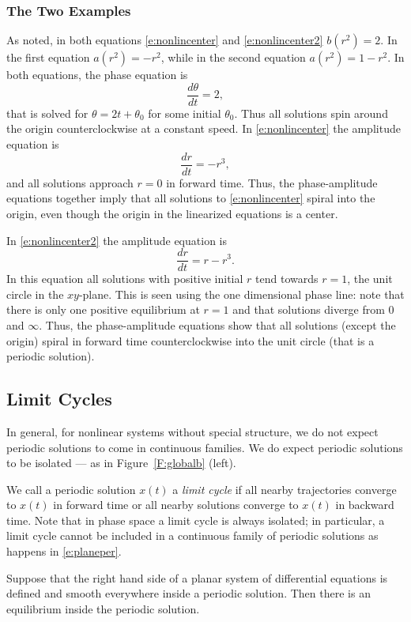 \documentclass{ximera}
\begin{document}
\subsubsection*{The Two Examples}

As noted, in both equations \eqref{e:nonlincenter} and \eqref{e:nonlincenter2}
$b(r^2) = 2$.  In the first equation $a(r^2) = -r^2$, while in
the second equation $a(r^2)=1-r^2$.  In both equations, the
phase equation is
\[
\frac{d\theta}{dt} = 2,
\]
that is solved for $\theta = 2t + \theta_0$ for some initial
$\theta_0$.  Thus all solutions spin around the origin
counterclockwise at a constant speed.  In \eqref{e:nonlincenter}
the amplitude equation is
\[
\frac{dr}{dt} = -r^3,
\]
and all solutions approach $r=0$ in forward time.  Thus, the 
phase-amplitude equations together imply that all solutions 
to \eqref{e:nonlincenter} spiral into the origin, even though the 
origin in the linearized equations is a center. 

In \eqref{e:nonlincenter2} the amplitude equation is 
\[
\frac{dr}{dt} = r-r^3.
\]
In this equation all solutions with positive initial $r$ tend towards 
$r=1$, the unit circle in the $xy$-plane.  This is seen using the one
dimensional phase line: note that there is only one positive equilibrium at 
$r=1$ and that solutions diverge from $0$ and $\infty$.  Thus, the 
phase-amplitude equations show that 
all solutions (except the origin) spiral in forward time counterclockwise 
into the unit circle (that is a periodic solution).

\subsection*{Limit Cycles}

In general, for nonlinear systems without special structure, 
we do not expect periodic solutions to come in continuous families.
We do expect periodic solutions to be isolated --- as in 
Figure~\ref{F:globalb} (left).  

We call a periodic solution $x(t)$ a {\em limit cycle\/} if all 
nearby trajectories converge to $x(t)$ in forward time or all nearby
solutions converge to $x(t)$ in backward time.  Note that in phase 
space a limit cycle is always isolated; in particular, a limit cycle 
cannot be included in a continuous family of periodic solutions as 
happens in \eqref{e:planeper}.

\begin{theorem} \label{T:PB}
Suppose that the right hand side of a planar system of differential 
equations is defined and smooth everywhere inside a periodic solution.  
Then there is an equilibrium inside the periodic solution.
\end{theorem} 
\end{document}
